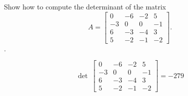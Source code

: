
\begin{exerciseStatement}


Show how to compute the determinant of the matrix \[A= \left[\begin{array}{cccc}
0 & -6 & -2 & 5 \\
-3 & 0 & 0 & -1 \\
6 & -3 & -4 & 3 \\
5 & -2 & -1 & -2
\end{array}\right] .\].


\end{exerciseStatement}
    
\begin{exerciseAnswer} 
\[\operatorname{det}\  \left[\begin{array}{cccc}
0 & -6 & -2 & 5 \\
-3 & 0 & 0 & -1 \\
6 & -3 & -4 & 3 \\
5 & -2 & -1 & -2
\end{array}\right] = -279 \]
\end{exerciseAnswer}
    
